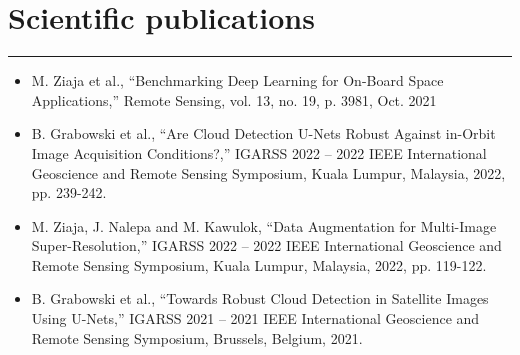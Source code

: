 \documentclass{article}
\begin{document}
\section*{Scientific publications}
\hrule \medskip
\begin{itemize}
	\item M. Ziaja et al., “Benchmarking Deep Learning for On-Board Space
		Applications,” Remote Sensing, vol. 13, no. 19, p. 3981, Oct. 2021
	\item B. Grabowski et al., “Are Cloud Detection U-Nets Robust Against
		in-Orbit Image Acquisition Conditions?,” IGARSS 2022 -- 2022 IEEE
		International Geoscience and Remote Sensing Symposium, Kuala Lumpur,
		Malaysia, 2022, pp. 239-242.
	\item M. Ziaja, J. Nalepa and M. Kawulok, “Data Augmentation for Multi-Image
		Super-Resolution,” IGARSS 2022 -- 2022 IEEE International Geoscience and
		Remote Sensing Symposium, Kuala Lumpur, Malaysia, 2022, pp. 119-122.
	\item B. Grabowski et al., “Towards Robust Cloud Detection in Satellite
		Images Using U-Nets,” IGARSS 2021 -- 2021 IEEE International Geoscience
		and Remote Sensing Symposium, Brussels, Belgium, 2021.
\end{itemize}
\end{document}

